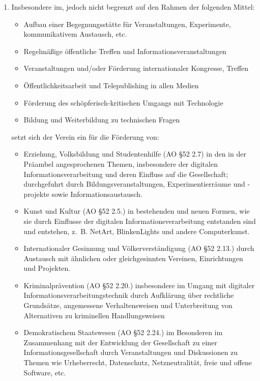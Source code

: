﻿\documentclass[10pt,a4paper]{scrartcl}
\begin{document}
\begin{enumerate}
\item Insbesondere im, jedoch nicht begrenzt auf den Rahmen der folgenden Mittel:
        \begin{itemize}
                \item Aufbau einer Begegnungsstätte für Veranstaltungen, Experimente, kommunikativem Austausch, etc.
                \item Regelmäßige öffentliche Treffen und Informationsveranstaltungen
                \item Veranstaltungen und/oder Förderung internationaler Kongresse, Treffen
                \item Öffentlichkeitsarbeit und Telepublishing in allen Medien
                \item Förderung des schöpferisch-kritischen Umgangs mit Technologie
                \item Bildung und Weiterbildung zu technischen Fragen
        \end{itemize}
        setzt sich der Verein ein für die Förderung von:
        \begin{itemize}
                \item Erziehung, Volksbildung und Studentenhilfe (AO §52 2.7) in den in der Präambel angesprochenen Themen,
                        insbesondere der digitalen Informationsverarbeitung und deren Einfluss auf die Gesellschaft;
                        durchgefuhrt durch Bildungsveranstaltungen, Experimentierräume und -projekte sowie Informationsaustausch.
                \item Kunst und Kultur (AO §52 2.5.) in bestehenden und neuen Formen, wie sie durch Einflusse der digitalen
                        Informationsverarbeitung entstanden sind und entstehen, z.\, B. NetArt, BlinkenLights und andere Computerkunst.
                \item Internationaler Gesinnung und Völkerverständigung (AO §52 2.13.) durch Austausch mit ähnlichen oder gleichgesinnten
                        Vereinen, Einrichtungen und Projekten.
                \item Kriminalprävention (AO §52 2.20.) insbesondere im Umgang mit digitaler Informationsverarbeitungstechnik durch
                        Aufklärung über rechtliche Grundsätze, angemessene Verhaltensweisen und Unterbreitung von Alternativen zu 
                        kriminellen Handlungsweisen
                \item Demokratischem Staatswesen (AO §52 2.24.) im Besonderen im Zusammenhang mit der Entwicklung der Gesellschaft 
                        zu einer Informationsgesellschaft durch Veranstaltungen und Diskussionen zu Themen wie Urheberrecht, Datenschutz, 
                        Netzneutralität, freie und offene Software, etc.
        \end{itemize}
\end{enumerate}
%
%
\end{document}
